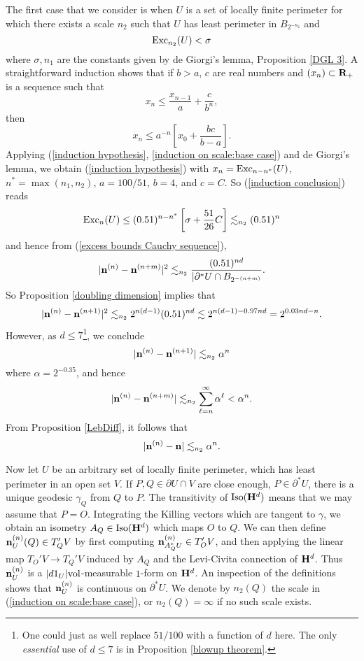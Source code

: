 The first case that we consider is when $U$ is a set of locally finite perimeter for which there exists a scale $n_2$ such that $U$ has least perimeter in $B_{2^{-n_2}}$ and
\begin{equation}\label{induction on scale:base case}
    \operatorname{Exc}_{n_2}(U) < \sigma
\end{equation}
where $\sigma, n_1$ are the constants given by de Giorgi's lemma, Proposition \ref{DGL 3}.
A straightforward induction shows that if $b > a$, $c$ are real numbers and $(x_n) \subset \mathbf{R}_+$ is a sequence such that
\begin{equation}\label{induction hypothesis}
x_n \leq \frac{x_{n - 1}}{a} + \frac{c}{b^n},
\end{equation}
then
\begin{equation}\label{induction conclusion}
x_n \leq a^{-n}\left[x_0 + \frac{bc}{b - a}\right].
\end{equation}
Applying (\ref{induction hypothesis}, \ref{induction on scale:base case}) and de Giorgi's lemma, we obtain (\ref{induction hypothesis}) with $x_n = \operatorname{Exc}_{n - n^*}(U)$, $n^* = \max(n_1, n_2)$, $a = 100/51$, $b = 4$, and $c = C$.
So (\ref{induction conclusion}) reads 
$$\operatorname{Exc}_n(U) \leq (0.51)^{n - n^*} \left[\sigma + \frac{51}{26}C\right] \lesssim_{n_2} (0.51)^n$$
and hence from (\ref{excess bounds Cauchy sequence}),
$$|\mathbf n^{(n)} - \mathbf n^{(n + m)}|^2 \lesssim_{n_2} \frac{(0.51)^{nd}}{|\partial^* U \cap B_{2^{-(n + m)}}}.$$
So Proposition \ref{doubling dimension} implies that 
$$|\mathbf n^{(n)} - \mathbf n^{(n + 1)}|^2 \lesssim_{n_2} 2^{n(d - 1)} (0.51)^{nd} \lesssim 2^{n(d - 1) - 0.97 nd} = 2^{0.03nd - n}.$$
However, as $d \leq 7$\footnote{One could just as well replace $51/100$ with a function of $d$ here. The only \emph{essential} use of $d \leq 7$ is in Proposition \ref{blowup theorem}.}, we conclude 
$$|\mathbf n^{(n)} - \mathbf n^{(n + 1)}| \lesssim_{n_2} \alpha^n$$
where $\alpha = 2^{-0.35}$, and hence 
$$|\mathbf n^{(n)} - \mathbf n^{(n + m)}| \lesssim_{n_2} \sum_{\ell=n}^\infty \alpha^\ell < \alpha^n.$$
From Proposition \ref{LebDiff}, it follows that 
\begin{equation}\label{normal convergence rate}
    |\mathbf n^{(n)} - \mathbf n| \lesssim_{n_2} \alpha^n.
\end{equation}

Now let $U$ be an arbitrary set of locally finite perimeter, which has least perimeter in an open set $V$.
If $P, Q \in \partial U \cap V$ are close enough, $P \in \partial^* U$, there is a unique geodesic $\gamma_Q$ from $Q$ to $P$.
The transitivity of $\operatorname{Iso}(\mathbf H^d)$ means that we may assume that $P = O$.
Integrating the Killing vectors which are tangent to $\gamma$, we obtain an isometry $A_Q \in \operatorname{Iso}(\mathbf H^d)$ which maps $O$ to $Q$.
We can then define $\mathbf n^{(n)}_U(Q) \in T_Q' V$ by first computing $\mathbf n^{(n)}_{A_Q^* U} \in T_O' V$, and then applying the linear map $T_O' V \to T_Q' V$ induced by $A_Q$ and the Levi-Civita connection of $\mathbf H^d$.
Thus $\mathbf n^{(n)}_U$ is a $|d1_U|\mathrm{vol}$-measurable $1$-form on $\mathbf H^d$.
An inspection of the definitions shows that $\mathbf n^{(n)}_U$ is continuous on $\partial^* U$.
We denote by $n_2(Q)$ the scale in (\ref{induction on scale:base case}), or $n_2(Q) = \infty$ if no such scale exists.

